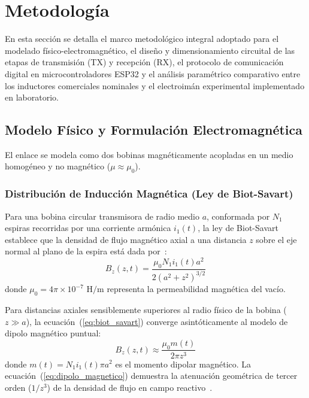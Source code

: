 \section{Metodología}
\label{sec:metodologia}

En esta sección se detalla el marco metodológico integral adoptado para el modelado físico-electromagnético, el diseño y dimensionamiento circuital de las etapas de transmisión (TX) y recepción (RX), el protocolo de comunicación digital en microcontroladores ESP32 y el análisis paramétrico comparativo entre los inductores comerciales nominales y el electroimán experimental implementado en laboratorio.

\subsection{Modelo Físico y Formulación Electromagnética}
\label{subsec:modelo_fisico}

El enlace se modela como dos bobinas magnéticamente acopladas en un medio homogéneo y no magnético ($\mu \approx \mu_0$).

\subsubsection{Distribución de Inducción Magnética (Ley de Biot-Savart)}
Para una bobina circular transmisora de radio medio $a$, conformada por $N_1$ espiras recorridas por una corriente armónica $i_1(t)$, la ley de Biot-Savart establece que la densidad de flujo magnético axial a una distancia $z$ sobre el eje normal al plano de la espira está dada por~\cite{hayt2012electromagnetics}:
\begin{equation}
    B_z(z, t) = \frac{\mu_0 N_1 i_1(t) a^2}{2 (a^2 + z^2)^{3/2}}
    \label{eq:biot_savart}
\end{equation}
donde $\mu_0 = 4\pi \times 10^{-7}\text{ H/m}$ representa la permeabilidad magnética del vacío.

Para distancias axiales sensiblemente superiores al radio físico de la bobina ($z \gg a$), la ecuación~(\ref{eq:biot_savart}) converge asintóticamente al modelo de dipolo magnético puntual:
\begin{equation}
    B_z(z, t) \approx \frac{\mu_0 m(t)}{2\pi z^3}
    \label{eq:dipolo_magnetico}
\end{equation}
donde $m(t) = N_1 i_1(t) \pi a^2$ es el momento dipolar magnético. La ecuación~(\ref{eq:dipolo_magnetico}) demuestra la atenuación geométrica de tercer orden ($1/z^3$) de la densidad de flujo en campo reactivo~\cite{finkenzeller2010rfid}.

